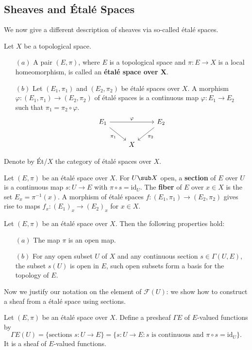 \subsection{Sheaves and \'Etal\'e Spaces}
We now give a different description of sheaves via so-called \'etal\'e spaces.
\begin{definition}
Let $X$ be a topological space.
\begin{itemize}
\item[$(a)$] A pair $(E,\pi)$, where $E$ is a topological space and $\pi:E\to X$ is a local homeomorphism, is called an \textbf{\'etal\'e space over $\bm{X}$}.
\item[$(b)$] Let $(E_1,\pi_1)$ and $(E_2,\pi_2)$ be \'etal\'e spaces over $X$. A morphism $\varphi:(E_1,\pi_1)\to(E_2,\pi_2)$ of \'etal\'e spaces is a continuous map $\varphi:E_1\to E_2$ such that $\pi_1=\pi_2\circ\varphi$.
\[\begin{tikzcd}
E_1\ar[rr,"\varphi"]\ar[rd,swap,"\pi_1"]&&E_2\ar[ld,"\pi_2"]\\
&X&
\end{tikzcd}\]
\end{itemize}
Denote by \'Et/$X$ the category of \'etal\'e spaces over $X$.
\end{definition}
\begin{definition}
Let $(E,\pi)$ be an étalé space over $X$. For $U\sub X$ open, a \textbf{section} of $E$ over $U$ is a continuous map $s:U\to E$ with $\pi\circ s=\mathrm{id}_U$. The \textbf{fiber} of $E$ over $x\in X$ is the set $E_x=\pi^{-1}(x)$. A morphism of étalé spaces $f:(E_1,\pi_1)\to(E_2,\pi_2)$ gives rise to maps $f_x:(E_1)_x\to(E_2)_x$ for $x\in X$.
\end{definition}
\begin{proposition}
Let $(E,\pi)$ be an étalé space over $X$. Then the following properties hold:
\begin{itemize}
\item[$(a)$] The map $\pi$ is an open map.
\item[$(b)$] For any open subset $U$ of $X$ and any continuous section $s\in\Gamma(U,E)$, the subset $s(U)$ is open in $E$, such open subsets form a basis for the topology of $E$.
\end{itemize}
\end{proposition}
Now we justify our notation on the element of $\mathscr{F}(U)$: we show how to construct a sheaf from a \'etal\'e space using sections.
\begin{definition}
Let $(E,\pi)$ be an étalé space over $X$. Define a presheaf $\Gamma E$ of $E$-valued functions by
\[\Gamma E(U)=\{\text{sections }s:U\to E\}=\{s:U\to E:\text{$s$ is continuous and $\pi\circ s=\mathrm{id}_U$}\}.\]
It is a sheaf of $E$-valued functions.
\end{definition}
